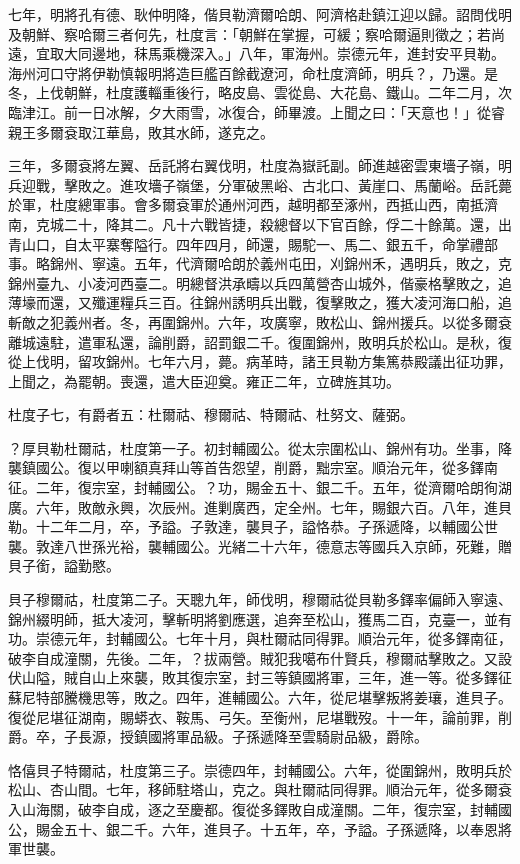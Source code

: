 \begin{pinyinscope}
七年，明將孔有德、耿仲明降，偕貝勒濟爾哈朗、阿濟格赴鎮江迎以歸。詔問伐明及朝鮮、察哈爾三者何先，杜度言：「朝鮮在掌握，可緩；察哈爾逼則徵之；若尚遠，宜取大同邊地，秣馬乘機深入。」八年，軍海州。崇德元年，進封安平貝勒。海州河口守將伊勒慎報明將造巨艦百餘截遼河，命杜度濟師，明兵？，乃還。是冬，上伐朝鮮，杜度護輜重後行，略皮島、雲從島、大花島、鐵山。二年二月，次臨津江。前一日冰解，夕大雨雪，冰復合，師畢渡。上聞之曰：「天意也！」從睿親王多爾袞取江華島，敗其水師，遂克之。

三年，多爾袞將左翼、岳託將右翼伐明，杜度為嶽託副。師進越密雲東墻子嶺，明兵迎戰，擊敗之。進攻墻子嶺堡，分軍破黑峪、古北口、黃崖口、馬蘭峪。岳託薨於軍，杜度總軍事。會多爾袞軍於通州河西，越明都至涿州，西抵山西，南抵濟南，克城二十，降其二。凡十六戰皆捷，殺總督以下官百餘，俘二十餘萬。還，出青山口，自太平寨奪隘行。四年四月，師還，賜駝一、馬二、銀五千，命掌禮部事。略錦州、寧遠。五年，代濟爾哈朗於義州屯田，刈錦州禾，遇明兵，敗之，克錦州臺九、小凌河西臺二。明總督洪承疇以兵四萬營杏山城外，偕豪格擊敗之，追薄壕而還，又殲運糧兵三百。往錦州誘明兵出戰，復擊敗之，獲大凌河海口船，追斬敵之犯義州者。冬，再圍錦州。六年，攻廣寧，敗松山、錦州援兵。以從多爾袞離城遠駐，遣軍私還，論削爵，詔罰銀二千。復圍錦州，敗明兵於松山。是秋，復從上伐明，留攻錦州。七年六月，薨。病革時，諸王貝勒方集篤恭殿議出征功罪，上聞之，為罷朝。喪還，遣大臣迎奠。雍正二年，立碑旌其功。

杜度子七，有爵者五：杜爾祜、穆爾祜、特爾祜、杜努文、薩弼。

？厚貝勒杜爾祜，杜度第一子。初封輔國公。從太宗圍松山、錦州有功。坐事，降襲鎮國公。復以甲喇額真拜山等首告怨望，削爵，黜宗室。順治元年，從多鐸南征。二年，復宗室，封輔國公。？功，賜金五十、銀二千。五年，從濟爾哈朗徇湖廣。六年，敗敵永興，次辰州。進剿廣西，定全州。七年，賜銀六百。八年，進貝勒。十二年二月，卒，予謚。子敦達，襲貝子，謚恪恭。子孫遞降，以輔國公世襲。敦達八世孫光裕，襲輔國公。光緒二十六年，德意志等國兵入京師，死難，贈貝子銜，謚勤愍。

貝子穆爾祜，杜度第二子。天聰九年，師伐明，穆爾祜從貝勒多鐸率偏師入寧遠、錦州綴明師，抵大凌河，擊斬明將劉應選，追奔至松山，獲馬二百，克臺一，並有功。崇德元年，封輔國公。七年十月，與杜爾祜同得罪。順治元年，從多鐸南征，破李自成潼關，先後。二年，？拔兩營。賊犯我噶布什賢兵，穆爾祜擊敗之。又設伏山隘，賊自山上來襲，敗其復宗室，封三等鎮國將軍，三年，進一等。從多鐸征蘇尼特部騰機思等，敗之。四年，進輔國公。六年，從尼堪擊叛將姜瓖，進貝子。復從尼堪征湖南，賜蟒衣、鞍馬、弓矢。至衡州，尼堪戰歿。十一年，論前罪，削爵。卒，子長源，授鎮國將軍品級。子孫遞降至雲騎尉品級，爵除。

恪僖貝子特爾祜，杜度第三子。崇德四年，封輔國公。六年，從圍錦州，敗明兵於松山、杏山間。七年，移師駐塔山，克之。與杜爾祜同得罪。順治元年，從多爾袞入山海關，破李自成，逐之至慶都。復從多鐸敗自成潼關。二年，復宗室，封輔國公，賜金五十、銀二千。六年，進貝子。十五年，卒，予謚。子孫遞降，以奉恩將軍世襲。


\end{pinyinscope}
